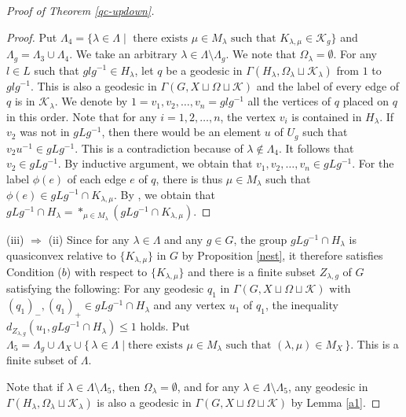 \documentclass{amsart}
\theoremstyle{definition}
\begin{document}
\begin{proof}[Proof of Theorem \ref{qc-updown}]
\begin{proof}
Put $\Lambda_4=\{ \lambda \in \Lambda \mid \text{ there exists } \mu \in M_\lambda \text{ such that } K_{\lambda,\mu} \in {\mathscr{K}}_g \}$ and $\Lambda_g=\Lambda_3 \cup \Lambda_4$. 
We take an arbitrary $\lambda \in \Lambda \setminus \Lambda_g$. 
We note that $\Omega_\lambda= \emptyset$. 
For any $l \in L$ such that $g l g^{-1} \in H_\lambda$, let $q$ be a geodesic in $\Gamma(H_\lambda, \Omega_\lambda \sqcup {\mathcal K}_\lambda)$ from $1$ to $g l g^{-1}$. 
This is also a geodesic in $\Gamma(G, X \sqcup \Omega \sqcup {\mathcal K})$ and the label of every edge of $q$ is in ${\mathcal K}_{\lambda}$. 
We denote by $1=v_1, v_2, \ldots , v_n=g l g^{-1}$ all the vertices of $q$ placed on $q$ in this order. 
Note that for any $i=1,2,\ldots,n$, the vertex $v_i$ is contained in $H_\lambda$. 
If $v_2$ was not in $g L g^{-1}$, then there would be an element $u$ of $U_g$ such that $v_2 u^{-1} \in g L g^{-1}$.
This is a contradiction because of $\lambda\notin \Lambda_4$. 
It follows that $v_2\in gLg^{-1}$. 
By inductive argument, we obtain that $v_1,v_2,\ldots,v_n\in gLg^{-1}$. 
For the label $\phi(e)$ of each edge $e$ of $q$, there is thus $\mu \in M_\lambda$ such that $\phi(e)\in gLg^{-1}\cap K_{\lambda,\mu}$. 
By \cite[Corollary just after Proposition 3 in Chapter I,  \S 1 (p.6)]{Serre}, we obtain that $gLg^{-1}\cap H_\lambda=\ast_{\mu\in M_\lambda}(gLg^{-1}\cap K_{\lambda,\mu})$. 
\end{proof}

(iii) $\Rightarrow$ (ii)
Since for any $\lambda\in\Lambda$ and any $g\in G$, the group $gLg^{-1}\cap H_\lambda$ is quasiconvex relative to $\{K_{\lambda,\mu}\}$ in $G$ by Proposition \ref{nest}, it therefore satisfies Condition ($b$) with respect to $\{K_{\lambda,\mu}\}$ and there is a finite subset $Z_{\lambda,g}$ of $G$ satisfying the following: 
For any geodesic $q_1$ in $\Gamma(G,X\sqcup\Omega\sqcup{\mathcal K})$ with $(q_1)_-,(q_1)_+\in gLg^{-1}\cap H_\lambda$ and any vertex $u_1$ of $q_1$, the inequality $d_{Z_{\lambda,g}}(u_1,gLg^{-1}\cap H_\lambda)\leq 1$ holds. 
Put $\Lambda_5=\Lambda_g\cup \Lambda_X\cup \{\,\lambda\in\Lambda \mid \text{there exists }\mu \in M_\lambda \text{ such that } (\lambda,\mu)\in M_X\,\}$. 
This is a finite subset of $\Lambda$. 

Note that if $\lambda\in \Lambda\setminus \Lambda_5$, then $\Omega_\lambda=\emptyset$, and for any $\lambda\in \Lambda\setminus \Lambda_5$, any geodesic in $\Gamma(H_\lambda,\Omega_\lambda\sqcup{\mathcal K}_\lambda)$ is also a geodesic in $\Gamma(G,X\sqcup\Omega\sqcup{\mathcal K})$ by Lemma \ref{a1}. 


\end{proof}
\end{document}
